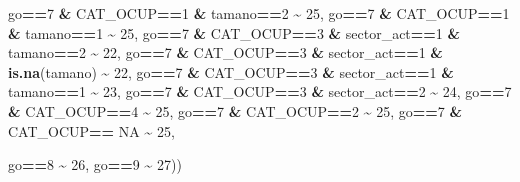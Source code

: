 \documentclass[
]{article}
\newenvironment{Shaded}{\begin{snugshade}}{\end{snugshade}}
\newcommand{\ConstantTok}[1]{\textcolor[rgb]{0.56,0.35,0.01}{#1}}
\newcommand{\DecValTok}[1]{\textcolor[rgb]{0.00,0.00,0.81}{#1}}
\newcommand{\FunctionTok}[1]{\textcolor[rgb]{0.13,0.29,0.53}{\textbf{#1}}}
\newcommand{\NormalTok}[1]{#1}
\newcommand{\SpecialCharTok}[1]{\textcolor[rgb]{0.81,0.36,0.00}{\textbf{#1}}}
\begin{document}
\begin{Shaded}
\begin{Highlighting}[]
\NormalTok{                               go}\SpecialCharTok{==}\DecValTok{7} \SpecialCharTok{\&}\NormalTok{ CAT\_OCUP}\SpecialCharTok{==}\DecValTok{1} \SpecialCharTok{\&}\NormalTok{ tamano}\SpecialCharTok{==}\DecValTok{2}  \SpecialCharTok{\textasciitilde{}} \DecValTok{25}\NormalTok{,}
\NormalTok{                               go}\SpecialCharTok{==}\DecValTok{7} \SpecialCharTok{\&}\NormalTok{ CAT\_OCUP}\SpecialCharTok{==}\DecValTok{1} \SpecialCharTok{\&}\NormalTok{ tamano}\SpecialCharTok{==}\DecValTok{1}  \SpecialCharTok{\textasciitilde{}} \DecValTok{25}\NormalTok{,}
\NormalTok{                               go}\SpecialCharTok{==}\DecValTok{7} \SpecialCharTok{\&}\NormalTok{ CAT\_OCUP}\SpecialCharTok{==}\DecValTok{3} \SpecialCharTok{\&}\NormalTok{ sector\_act}\SpecialCharTok{==}\DecValTok{1} \SpecialCharTok{\&}\NormalTok{ tamano}\SpecialCharTok{==}\DecValTok{2}  \SpecialCharTok{\textasciitilde{}} \DecValTok{22}\NormalTok{,}
\NormalTok{                               go}\SpecialCharTok{==}\DecValTok{7} \SpecialCharTok{\&}\NormalTok{ CAT\_OCUP}\SpecialCharTok{==}\DecValTok{3} \SpecialCharTok{\&}\NormalTok{ sector\_act}\SpecialCharTok{==}\DecValTok{1} \SpecialCharTok{\&} \FunctionTok{is.na}\NormalTok{(tamano) }\SpecialCharTok{\textasciitilde{}} \DecValTok{22}\NormalTok{,}
\NormalTok{                               go}\SpecialCharTok{==}\DecValTok{7} \SpecialCharTok{\&}\NormalTok{ CAT\_OCUP}\SpecialCharTok{==}\DecValTok{3} \SpecialCharTok{\&}\NormalTok{ sector\_act}\SpecialCharTok{==}\DecValTok{1} \SpecialCharTok{\&}\NormalTok{ tamano}\SpecialCharTok{==}\DecValTok{1}  \SpecialCharTok{\textasciitilde{}} \DecValTok{23}\NormalTok{,}
\NormalTok{                               go}\SpecialCharTok{==}\DecValTok{7} \SpecialCharTok{\&}\NormalTok{ CAT\_OCUP}\SpecialCharTok{==}\DecValTok{3} \SpecialCharTok{\&}\NormalTok{ sector\_act}\SpecialCharTok{==}\DecValTok{2}  \SpecialCharTok{\textasciitilde{}} \DecValTok{24}\NormalTok{,}
\NormalTok{                               go}\SpecialCharTok{==}\DecValTok{7} \SpecialCharTok{\&}\NormalTok{ CAT\_OCUP}\SpecialCharTok{==}\DecValTok{4}  \SpecialCharTok{\textasciitilde{}} \DecValTok{25}\NormalTok{,}
\NormalTok{                               go}\SpecialCharTok{==}\DecValTok{7} \SpecialCharTok{\&}\NormalTok{ CAT\_OCUP}\SpecialCharTok{==}\DecValTok{2}  \SpecialCharTok{\textasciitilde{}} \DecValTok{25}\NormalTok{,}
\NormalTok{                               go}\SpecialCharTok{==}\DecValTok{7} \SpecialCharTok{\&}\NormalTok{ CAT\_OCUP}\SpecialCharTok{==} \ConstantTok{NA}    \SpecialCharTok{\textasciitilde{}} \DecValTok{25}\NormalTok{,}
                              
\NormalTok{                            go}\SpecialCharTok{==}\DecValTok{8} \SpecialCharTok{\textasciitilde{}} \DecValTok{26}\NormalTok{,}
\NormalTok{                            go}\SpecialCharTok{==}\DecValTok{9}   \SpecialCharTok{\textasciitilde{}} \DecValTok{27}\NormalTok{))}
\end{Highlighting}
\end{Shaded}
\end{document}
